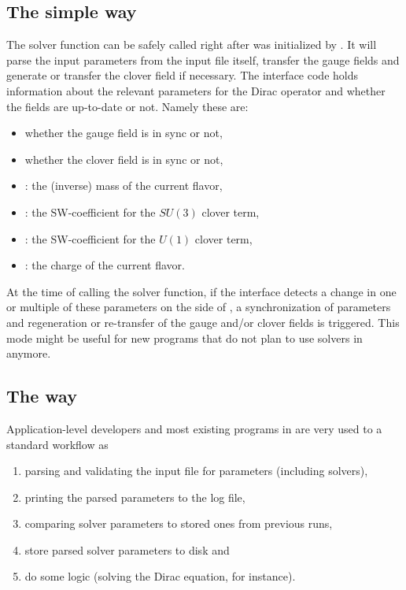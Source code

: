 \subsection{The simple way}
\label{sec:develop:sync:way}

The solver function  can be safely called right after \quda was initialized by .
It will parse the input parameters from the input file itself, transfer the gauge fields and generate or transfer the clover field if necessary.
The interface code holds information about the relevant parameters for the Dirac operator and whether the fields are up-to-date or not.
Namely these are:
\begin{itemize}
  \item whether the gauge field is in sync or not,
  \item whether the clover field is in sync or not,
  \item {}: the (inverse) mass of the current flavor,
  \item {}: the SW-coefficient for the $SU(3)$ clover term,
  \item {}: the SW-coefficient for the $U(1)$ clover term,
  \item {}: the charge of the current flavor.
\end{itemize}
At the time of calling the solver function, if the interface detects a change in one or multiple of these parameters on the side of \openqxd, a synchronization of parameters and regeneration or re-transfer of the gauge and/or clover fields is triggered.
This mode might be useful for new programs that do not plan to use solvers in \openqxd anymore.

\subsection{The \openqcd way}
\label{sec:develop:openqcd:way}

Application-level developers and most existing programs in \openqxd are very used to a standard workflow as
\begin{enumerate}
  \item parsing and validating the input file for parameters (including solvers),
  \item printing the parsed parameters to the log file,
  \item comparing solver parameters to stored ones from previous runs,
  \item store parsed solver parameters to disk and
  \item do some logic (solving the Dirac equation, for instance).
\end{enumerate}

